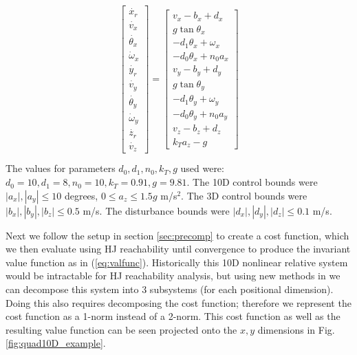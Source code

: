 \begin{equation}
\label{eq:Quad10DRel_dyn}
\begin{aligned}
\begin{array}{c}
\left[
\begin{array}{c}
\dot{x_r}\\
\dot{v_{x}}\\
\dot{\theta_{x}}\\
\dot\omega_{x}\\
\dot{y_r}\\
\dot{v_{y}}\\
\dot{\theta_{y}}\\
\dot\omega_{y}\\
\dot{z_r}\\
\dot{v_{z}}
\end{array}
\right]
=
\left[
\begin{array}{c}
v_x - b_x + d_x\\
g \tan \theta_x\\
-d_1 \theta_x + \omega_x\\
-d_0 \theta_x + n_0 a_x\\
v_y - b_y + d_y\\
g \tan \theta_y\\
-d_1 \theta_y + \omega_y\\
-d_0 \theta_y + n_0 a_y\\
v_z - b_z + d_z\\
k_T a_z - g
\end{array}
\right]
\end{array}\\
\end{aligned}
\end{equation}
The values for parameters $d_0,d_1,n_0,k_T,g$ used were: $d_0=10,d_1=8,n_0=10,k_T=0.91,g=9.81$. The 10D control bounds were $|a_x|,|a_y|\leq10$ degrees, $0\leq a_z\leq 1.5g$ m/s$^{2}$. The 3D control bounds were $|b_x|,|b_y|,|b_z|\leq0.5$ m/s. The disturbance bounds were $|d_x|,|d_y|,|d_z|\leq0.1$ m/s. 

Next we follow the setup in section \ref{sec:precomp} to create a cost function, which we then evaluate using HJ reachability until convergence to produce the invariant value function as in (\ref{eq:valfunc}). Historically this 10D nonlinear relative system would be intractable for HJ reachability analysis, but using new methods in \cite{Chen2016DecouplingExact, Chen2016DecouplingJournal} we can decompose this system into 3 subsystems (for each positional dimension). Doing this also requires decomposing the cost function; therefore we represent the cost function as a 1-norm instead of a 2-norm. This cost function as well as the resulting value function can be seen projected onto the $x,y$ dimensions in Fig. \ref{fig:quad10D_example}.

